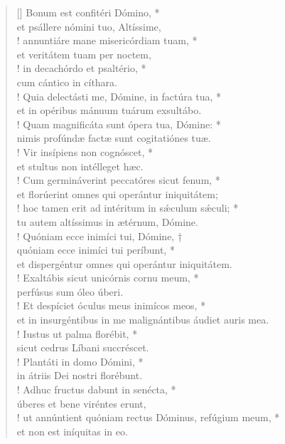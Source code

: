 \begin{verse}[\versewidth]
Bonum est confitéri Dómino, *\\
et psállere nómini tuo, Altíssime,\\!
\vin annuntiáre mane misericórdiam tuam, *\\
\vin et veritátem tuam per noctem,\\!
in decachórdo et psaltério, *\\
cum cántico in cíthara.\\!
\vin Quia delectásti me, Dómine, in factúra tua, *\\
\vin et in opéribus mánuum tuárum exsultábo.\\!
Quam magnificáta sunt ópera tua, Dómine: *\\
nimis profúndæ factæ sunt cogitatiónes tuæ.\\!
\vin Vir insípiens non cognóscet, *\\
\vin et stultus non intélleget hæc.\\!
Cum germináverint peccatóres sicut fenum, *\\
et florúerint omnes qui operántur iniquitátem;\\!
\vin hoc tamen erit ad intéritum in s\'{æ}culum s\'{æ}culi; *\\
\vin tu autem altíssimus in ætérnum, Dómine.\\!
Quóniam ecce inimíci tui, Dómine, †\\
quóniam ecce inimíci tui períbunt, *\\
et dispergéntur omnes qui operántur iniquitátem.\\!
\vin Exaltábis sicut unicórnis cornu meum, *\\
\vin perfúsus sum óleo úberi.\\!
Et despíciet óculus meus inimícos meos, *\\
et in insurgéntibus in me malignántibus áudiet auris mea.\\!
\vin Iustus ut palma florébit, *\\
\vin sicut cedrus Líbani succréscet.\\!
Plantáti in domo Dómini, *\\
in átriis Dei nostri florébunt.\\!
\vin Adhuc fructus dabunt in senécta, *\\
\vin úberes et bene viréntes erunt,\\!
ut annúntient quóniam rectus Dóminus, refúgium meum, *\\
et non est iníquitas in eo.\\
\end{verse}
\vspace{1cm}


